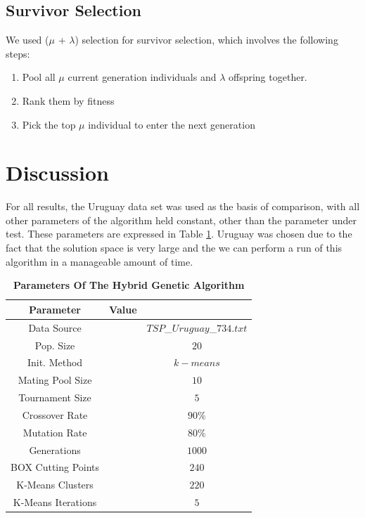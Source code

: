 \documentclass[12pt,twocolumn,oneside]{osajnl}
\begin{document}
\subsection{Survivor Selection}
We used ($\mu$ + $\lambda$) selection for survivor selection, which involves the following steps:

\begin{enumerate}
    \item Pool all $\mu$ current generation individuals and $\lambda$ offspring together.
    \item Rank them by fitness
    \item Pick the top $\mu$ individual to enter the next generation
\end{enumerate}







\section{Discussion}
For all results, the Uruguay data set was used as the basis of comparison, with all other parameters of the algorithm held constant, other than the parameter under test. These parameters are expressed in Table \ref{tab:parameters}. Uruguay was chosen due to the fact that the solution space is very large and the we can perform a run of this algorithm in a manageable amount of time.
\begin{table}[htbp]
\centering
\caption{\bf Parameters Of The Hybrid Genetic Algorithm}
\begin{tabular}{ccc}
\hline
Parameter & Value \\
\hline
Data Source && $TSP$_$Uruguay$_$734.txt$ \\
Pop. Size && $20$ \\
Init. Method && $k-means$ \\
Mating Pool Size && $10$ \\
Tournament Size && $5$ \\
Crossover Rate && $90\%$ \\
Mutation Rate && $80\%$ \\
Generations && $1000$ \\
BOX Cutting Points && $240$ \\
K-Means Clusters && $220$ \\
K-Means Iterations && $5$ \\


\hline
\end{tabular}
  \label{tab:parameters}
\end{table}
\end{document}
